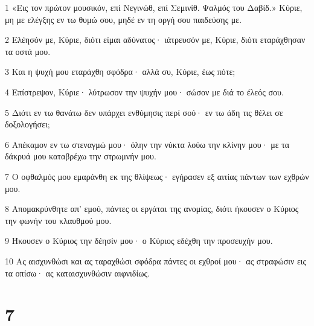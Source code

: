 \par 1 «Εις τον πρώτον μουσικόν, επί Νεγινώθ, επί Σεμινίθ. Ψαλμός του Δαβίδ.» Κύριε, μη με ελέγξης εν τω θυμώ σου, μηδέ εν τη οργή σου παιδεύσης με.
\par 2 Ελέησόν με, Κύριε, διότι είμαι αδύνατος· ιάτρευσόν με, Κύριε, διότι εταράχθησαν τα οστά μου.
\par 3 Και η ψυχή μου εταράχθη σφόδρα· αλλά συ, Κύριε, έως πότε;
\par 4 Επίστρεψον, Κύριε· λύτρωσον την ψυχήν μου· σώσον με διά το έλεός σου.
\par 5 Διότι εν τω θανάτω δεν υπάρχει ενθύμησις περί σού· εν τω άδη τις θέλει σε δοξολογήσει;
\par 6 Απέκαμον εν τω στεναγμώ μου· όλην την νύκτα λούω την κλίνην μου· με τα δάκρυά μου καταβρέχω την στρωμνήν μου.
\par 7 Ο οφθαλμός μου εμαράνθη εκ της θλίψεως· εγήρασεν εξ αιτίας πάντων των εχθρών μου.
\par 8 Απομακρύνθητε απ' εμού, πάντες οι εργάται της ανομίας, διότι ήκουσεν ο Κύριος την φωνήν του κλαυθμού μου.
\par 9 Ήκουσεν ο Κύριος την δέησίν μου· ο Κύριος εδέχθη την προσευχήν μου.
\par 10 Ας αισχυνθώσι και ας ταραχθώσι σφόδρα πάντες οι εχθροί μου· ας στραφώσιν εις τα οπίσω· ας καταισχυνθώσιν αιφνιδίως.

\chapter{7}

